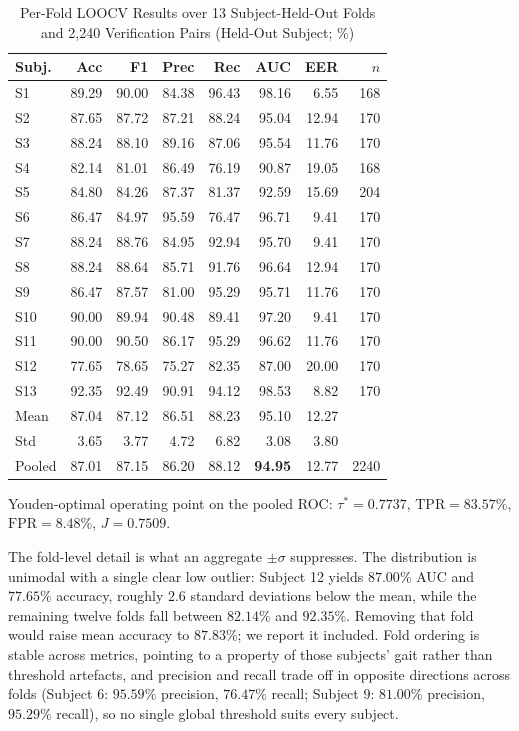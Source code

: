 \documentclass[conference]{IEEEtran}
\newcommand{\tabhead}[1]{\textbf{#1}}
\begin{document}
\begin{table}[!tb]
\caption{Per-Fold LOOCV Results over 13 Subject-Held-Out Folds and
2{,}240 Verification Pairs (Held-Out Subject; \%)}
\label{tab:perfold}
\centering
\footnotesize
\setlength{\tabcolsep}{4pt}
\begin{tabular}{@{}lrrrrrrr@{}}
\toprule
\tabhead{Subj.} & \tabhead{Acc} & \tabhead{F1} & \tabhead{Prec} &
\tabhead{Rec} & \tabhead{AUC} & \tabhead{EER} & \tabhead{$n$} \\
\midrule
S1  & 89.29 & 90.00 & 84.38 & 96.43 & 98.16 &  6.55 & 168 \\
S2  & 87.65 & 87.72 & 87.21 & 88.24 & 95.04 & 12.94 & 170 \\
S3  & 88.24 & 88.10 & 89.16 & 87.06 & 95.54 & 11.76 & 170 \\
S4  & 82.14 & 81.01 & 86.49 & 76.19 & 90.87 & 19.05 & 168 \\
S5  & 84.80 & 84.26 & 87.37 & 81.37 & 92.59 & 15.69 & 204 \\
S6  & 86.47 & 84.97 & 95.59 & 76.47 & 96.71 &  9.41 & 170 \\
S7  & 88.24 & 88.76 & 84.95 & 92.94 & 95.70 &  9.41 & 170 \\
S8  & 88.24 & 88.64 & 85.71 & 91.76 & 96.64 & 12.94 & 170 \\
S9  & 86.47 & 87.57 & 81.00 & 95.29 & 95.71 & 11.76 & 170 \\
S10 & 90.00 & 89.94 & 90.48 & 89.41 & 97.20 &  9.41 & 170 \\
S11 & 90.00 & 90.50 & 86.17 & 95.29 & 96.62 & 11.76 & 170 \\
S12 & 77.65 & 78.65 & 75.27 & 82.35 & 87.00 & 20.00 & 170 \\
S13 & 92.35 & 92.49 & 90.91 & 94.12 & 98.53 &  8.82 & 170 \\
\midrule
Mean    & 87.04 & 87.12 & 86.51 & 88.23 & 95.10 & 12.27 & \\
Std     &  3.65 &  3.77 &  4.72 &  6.82 &  3.08 &  3.80 & \\
Pooled  & 87.01 & 87.15 & 86.20 & 88.12 & \textbf{94.95} & 12.77 & 2240 \\
\bottomrule
\end{tabular}

\vspace{2pt}
\raggedright\footnotesize
Youden-optimal operating point on the pooled ROC: $\tau^* = 0.7737$,
$\mathrm{TPR} = 83.57\%$, $\mathrm{FPR} = 8.48\%$, $J = 0.7509$.
\end{table}

The fold-level detail is what an aggregate $\pm\sigma$ suppresses. The
distribution is unimodal with a single clear low outlier: Subject 12 yields
$87.00\%$ AUC and $77.65\%$ accuracy, roughly $2.6$ standard deviations below
the mean, while the remaining twelve folds fall between $82.14\%$ and
$92.35\%$. Removing that fold would raise mean accuracy to $87.83\%$; we report
it included. Fold ordering is stable across metrics, pointing to a property of those subjects' gait rather than threshold artefacts, and precision and recall trade off in opposite directions across folds (Subject 6: $95.59\%$ precision, $76.47\%$ recall; Subject 9: $81.00\%$ precision, $95.29\%$ recall), so no single global threshold suits every subject.
\end{document}
